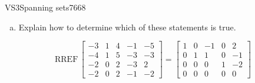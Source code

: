 \begin{exercise}{VS3}{Spanning sets}{7668}
\begin{exerciseStatement}
\begin{enumerate}[(a)]
\begin{itemize}
 The set of vectors \(\left\{ \left[\begin{array}{c}
-3 \\
-4 \\
-2 \\
-2
\end{array}\right] , \left[\begin{array}{c}
1 \\
1 \\
0 \\
0
\end{array}\right] , \left[\begin{array}{c}
4 \\
5 \\
2 \\
2
\end{array}\right] , \left[\begin{array}{c}
-1 \\
-3 \\
-3 \\
-1
\end{array}\right] , \left[\begin{array}{c}
-5 \\
-3 \\
2 \\
-2
\end{array}\right] \right\}\) does \textbf{not} span \(\mathbb R^4\). 

 
\end{itemize}

     
\item  

 Explain how to determine which of these statements is true. 

 
\end{enumerate}

     \end{exerciseStatement}
 \begin{exerciseAnswer} 

 \[
\mathrm{RREF}\, \left[\begin{array}{ccccc}
-3 & 1 & 4 & -1 & -5 \\
-4 & 1 & 5 & -3 & -3 \\
-2 & 0 & 2 & -3 & 2 \\
-2 & 0 & 2 & -1 & -2
\end{array}\right] = \left[\begin{array}{ccccc}
1 & 0 & -1 & 0 & 2 \\
0 & 1 & 1 & 0 & -1 \\
0 & 0 & 0 & 1 & -2 \\
0 & 0 & 0 & 0 & 0
\end{array}\right]
            \] 


\end{exerciseAnswer}
\end{exercise}
